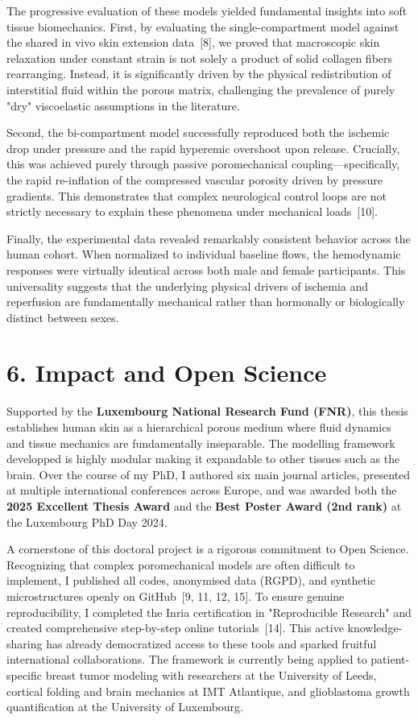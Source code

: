 \documentclass[11pt, a4paper]{article}
\begin{document}
The progressive evaluation of these models yielded fundamental insights into soft tissue biomechanics. 
First, by evaluating the single-compartment model against the shared in vivo skin extension data~[8], we proved that macroscopic skin relaxation under constant strain is not solely a product of solid collagen fibers rearranging. 
Instead, it is significantly driven by the physical redistribution of interstitial fluid within the porous matrix, challenging the prevalence of purely "dry" viscoelastic assumptions in the literature.

Second, the bi-compartment model successfully reproduced both the ischemic drop under pressure and the rapid hyperemic overshoot upon release. 
Crucially, this was achieved purely through passive poromechanical coupling—specifically, the rapid re-inflation of the compressed vascular porosity driven by pressure gradients. 
This demonstrates that complex neurological control loops are not strictly necessary to explain these phenomena under mechanical loads~[10]. 

Finally, the experimental data revealed remarkably consistent behavior across the human cohort. 
When normalized to individual baseline flows, the hemodynamic responses were virtually identical across both male and female participants. 
This universality suggests that the underlying physical drivers of ischemia and reperfusion are fundamentally mechanical rather than hormonally or biologically distinct between sexes.

\section*{6. Impact and Open Science}
Supported by the \textbf{Luxembourg National Research Fund (FNR)}, this thesis establishes human skin as a hierarchical porous medium where fluid dynamics and tissue mechanics are fundamentally inseparable. 
The modelling framework developped is highly modular making it expandable to other tissues such as the brain. 
Over the course of my PhD, I authored six main journal articles, presented at multiple international conferences across Europe, and was awarded both the \textbf{2025 Excellent Thesis Award} and the \textbf{Best Poster Award (2nd rank)} at the Luxembourg PhD Day 2024.

A cornerstone of this doctoral project is a rigorous commitment to Open Science. 
Recognizing that complex poromechanical models are often difficult to implement, I published all codes, anonymised data (RGPD), and synthetic microstructures openly on GitHub~[9, 11, 12, 15]. 
To ensure genuine reproducibility, I completed the Inria certification in "Reproducible Research" and created comprehensive step-by-step online tutorials~[14]. 
This active knowledge-sharing has already democratized access to these tools and sparked fruitful international collaborations. 
The framework is currently being applied to patient-specific breast tumor modeling with researchers at the University of Leeds, cortical folding and brain mechanics at IMT Atlantique, and glioblastoma growth quantification at the University of Luxembourg.
\end{document}
